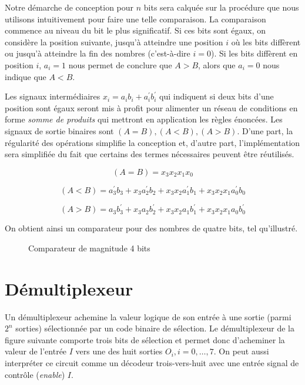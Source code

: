 \documentclass[letter, oneside]{book}
\begin{document}
Notre démarche de conception pour \(n\) bits sera calquée sur la
procédure que nous utilisons intuitivement pour faire une telle
comparaison. La comparaison commence au niveau du bit le plus
significatif. Si ces bits sont égaux, on considère la position
suivante, jusqu'à atteindre une position \(i\) où les bits diffèrent
ou jusqu'à atteindre la fin des nombres (c'est-à-dire \(i=0\)). Si les
bits diffèrent en position \(i\), \(a_i = 1\) nous permet de conclure
que \(A > B\), alors que \(a_i = 0\) nous indique que \(A < B\).

Les signaux intermédiaires \(x_i = a_i b_i + a_i^\prime b_i^\prime\)
qui indiquent si deux bits d'une position sont égaux seront mis à
profit pour alimenter un réseau de conditions en forme \emph{somme de
produits} qui mettront en application les règles énoncées. Les signaux
de sortie binaires sont \((A = B), (A < B), (A > B)\).  D'une part,
la régularité des opérations simplifie la conception et, d'autre part,
l'implémentation sera simplifiée du fait que certains des termes
nécessaires peuvent être réutilisés.

$$(A = B) = x_3 x_2 x_1 x_0$$

$$(A < B) = a_3^\prime b_3 + x_3  a_2^\prime b_2  +  x_3 x_2  a_1^\prime b_1 +  x_3 x_2 x_1  a_0^\prime b_0$$

$$(A > B) = a_3 b_3^\prime + x_3  a_2 b_2^\prime  +  x_3 x_2  a_1 b_1^\prime +  x_3 x_2 x_1  a_0 b_0^\prime$$

On obtient ainsi un comparateur pour des nombres de quatre bits, tel qu'illustré.

\begin{figure}[htbp]
\centering

\caption{\label{fig:orgd62d427}Comparateur de magnitude 4 bits}
\end{figure}

\section{Démultiplexeur}
\label{sec:orga1f2ce3}

Un démultiplexeur achemine la valeur logique de son entrée à une
sortie (parmi \(2^n\) sorties) sélectionnée par un code binaire de
sélection. Le démultiplexeur de la figure suivante comporte trois bits
de sélection et permet donc d'acheminer la valeur de l'entrée \(I\)
vers une des huit sorties \(O_i, i = 0, \ldots, 7\). On peut aussi
interpréter ce circuit comme un décodeur trois-vers-huit avec une
entrée signal de contrôle (\emph{enable}) \(I\).
\end{document}
